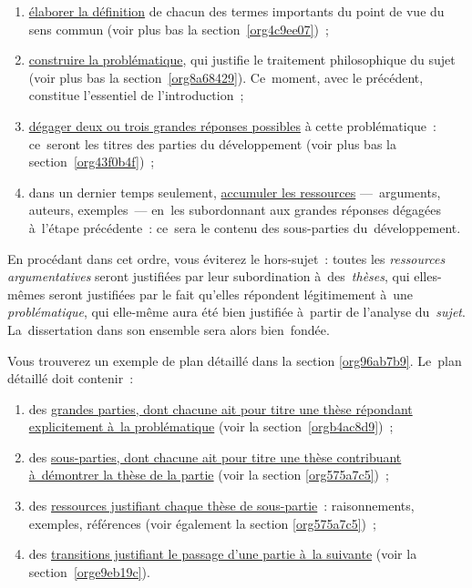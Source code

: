 \documentclass[a4paper,12pt]{report}
\begin{document}
\begin{enumerate}
\item \uline{élaborer la définition} de chacun des termes importants du point de
vue du sens commun (voir plus bas la section \ref{org4c9ee07}) ;

\item \uline{construire la problématique}, qui justifie le traitement
philosophique du sujet (voir plus bas la section \ref{org8a68429}).
Ce moment, avec le précédent, constitue l'essentiel de
l'introduction ;

\item \uline{dégager deux ou trois grandes réponses possibles} à cette
problématique : ce seront les titres des parties du développement
(voir plus bas la section \ref{org43f0b4f}) ;

\item dans un dernier temps seulement, \uline{accumuler les ressources}
--- arguments, auteurs, exemples --- en les subordonnant aux grandes
réponses dégagées à l'étape précédente : ce sera le contenu des
sous-parties du développement.
\end{enumerate}

En procédant dans cet ordre, vous éviterez le hors-sujet : toutes les
\emph{ressources argumentatives} seront justifiées par leur subordination
à des \emph{thèses}, qui elles-mêmes seront justifiées par le fait qu'elles
répondent légitimement à une \emph{problématique}, qui elle-même aura été
bien justifiée à partir de l'analyse du \emph{sujet}. La dissertation dans
son ensemble sera alors bien fondée.

Vous trouverez un exemple de plan détaillé dans la section \ref{org96ab7b9}.
Le plan détaillé doit contenir :

\begin{enumerate}
\item des \uline{grandes parties, dont chacune ait pour titre une thèse répondant
explicitement à la problématique} (voir la section \ref{orgb4ac8d9}) ;

\item des \uline{sous-parties, dont chacune ait pour titre une thèse contribuant
à démontrer la thèse de la partie} (voir la section \ref{org575a7c5}) ;

\item des \uline{ressources justifiant chaque thèse de sous-partie} :
raisonnements, exemples, références (voir également la section
\ref{org575a7c5}) ;

\item des \uline{transitions justifiant le passage d'une partie à la suivante}
(voir la section \ref{orge9eb19c}).
\end{enumerate}
\end{document}
